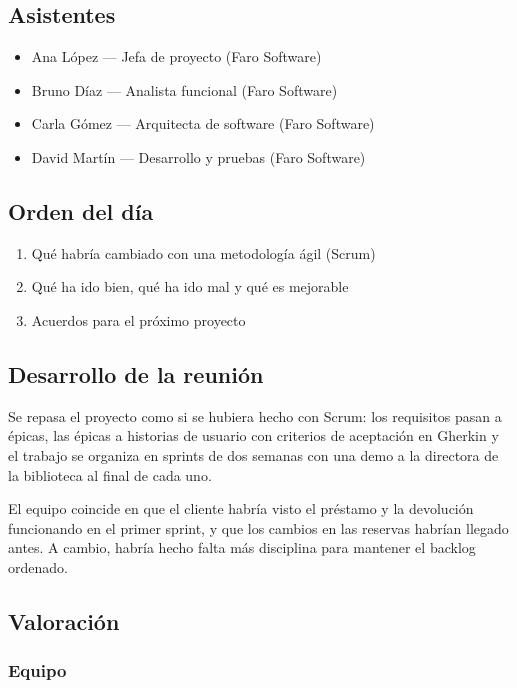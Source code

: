 \documentclass[11pt,a4paper]{article}
\begin{document}
\subsection*{Asistentes}

\begin{itemize}
\item Ana López — Jefa de proyecto (Faro Software)
\item Bruno Díaz — Analista funcional (Faro Software)
\item Carla Gómez — Arquitecta de software (Faro Software)
\item David Martín — Desarrollo y pruebas (Faro Software)
\end{itemize}

\subsection*{Orden del día}

\begin{enumerate}
\item Qué habría cambiado con una metodología ágil (Scrum)
\item Qué ha ido bien, qué ha ido mal y qué es mejorable
\item Acuerdos para el próximo proyecto
\end{enumerate}

\subsection*{Desarrollo de la reunión}

Se repasa el proyecto como si se hubiera hecho con Scrum: los requisitos pasan a épicas, las épicas a historias de usuario con criterios de aceptación en Gherkin y el trabajo se organiza en sprints de dos semanas con una demo a la directora de la biblioteca al final de cada uno.

El equipo coincide en que el cliente habría visto el préstamo y la devolución funcionando en el primer sprint, y que los cambios en las reservas habrían llegado antes. A cambio, habría hecho falta más disciplina para mantener el backlog ordenado.

\subsection*{Valoración}

\subsubsection*{Equipo}
\end{document}
